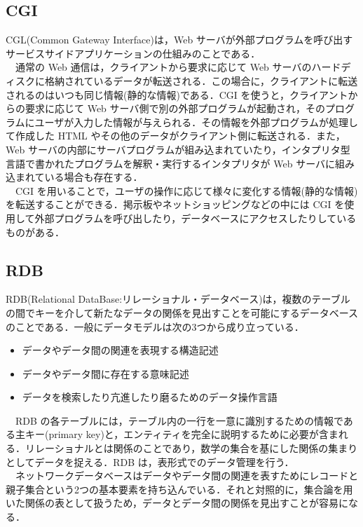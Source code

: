 \documentclass[a4j,titlepage]{jarticle}
\begin{document}
\subsection{CGI}
CGL(Common Gateway Interface)は，Web サーバが外部プログラムを呼び出すサービスサイドアプリケーションの仕組みのことである．\\
　通常の Web 通信は，クライアントから要求に応じて Web サーバのハードディスクに格納されているデータが転送される．この場合に，クライアントに転送されるのはいつも同じ情報(静的な情報)である．CGI を使うと，クライアントからの要求に応じて Web サーバ側で別の外部プログラムが起動され，そのプログラムにユーザが入力した情報が与えられる．その情報を外部プログラムが処理して作成した HTML やその他のデータがクライアント側に転送される．また，Web サーバの内部にサーバプログラムが組み込まれていたり，インタプリタ型言語で書かれたプログラムを解釈・実行するインタプリタが Web サーバに組み込まれている場合も存在する．\\
　CGI を用いることで，ユーザの操作に応じて様々に変化する情報(静的な情報)を転送することができる．掲示板やネットショッピングなどの中には CGI を使用して外部プログラムを呼び出したり，データベースにアクセスしたりしているものがある\cite{bib:iptext}．


%
\subsection{RDB}
RDB(Relational DataBase:リレーショナル・データベース)は，複数のテーブルの間でキーを介して新たなデータの関係を見出すことを可能にするデータベースのことである．一般にデータモデルは次の3つから成り立っている．\\

\begin{itemize}
\item データやデータ間の関連を表現する構造記述

\item データやデータ間に存在する意味記述

\item データを検索したり亢進したり磨るためのデータ操作言語
\end{itemize}

　RDB の各テーブルには，テーブル内の一行を一意に識別するための情報である主キー(primary key)と，エンティティを完全に説明するために必要が含まれる．リレーショナルとは関係のことであり，数学の集合を基にした関係の集まりとしてデータを捉える．RDB は，表形式でのデータ管理を行う．\\
　ネットワークデータベースはデータやデータ間の関連を表すためにレコードと親子集合という2つの基本要素を持ち込んでいる．それと対照的に，集合論を用いた関係の表として扱うため，データとデータ間の関係を見出すことが容易になる\cite{bib:sqltext}\cite{bib:rdbtext}．
\end{document}
